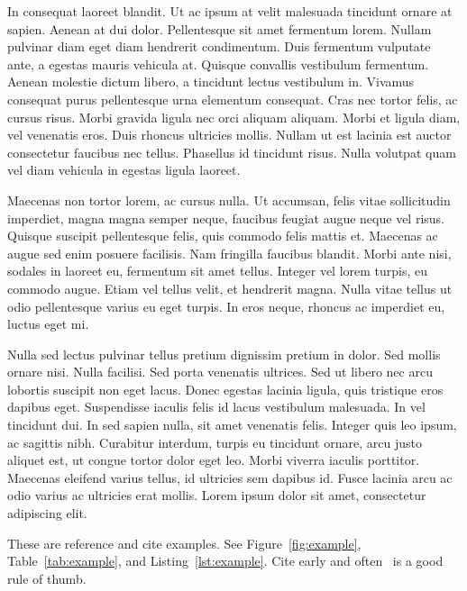 In consequat laoreet blandit. Ut ac ipsum at velit malesuada tincidunt ornare at sapien. Aenean at dui dolor. Pellentesque sit amet fermentum lorem. Nullam pulvinar diam eget diam hendrerit condimentum. Duis fermentum vulputate ante, a egestas mauris vehicula at. Quisque convallis vestibulum fermentum. Aenean molestie dictum libero, a tincidunt lectus vestibulum in. Vivamus consequat purus pellentesque urna elementum consequat. Cras nec tortor felis, ac cursus risus. Morbi gravida ligula nec orci aliquam aliquam. Morbi et ligula diam, vel venenatis eros. Duis rhoncus ultricies mollis. Nullam ut est lacinia est auctor consectetur faucibus nec tellus. Phasellus id tincidunt risus. Nulla volutpat quam vel diam vehicula in egestas ligula laoreet. 

Maecenas non tortor lorem, ac cursus nulla. Ut accumsan, felis vitae sollicitudin imperdiet, magna magna semper neque, faucibus feugiat augue neque vel risus. Quisque suscipit pellentesque felis, quis commodo felis mattis et. Maecenas ac augue sed enim posuere facilisis. Nam fringilla faucibus blandit. Morbi ante nisi, sodales in laoreet eu, fermentum sit amet tellus. Integer vel lorem turpis, eu commodo augue. Etiam vel tellus velit, et hendrerit magna. Nulla vitae tellus ut odio pellentesque varius eu eget turpis. In eros neque, rhoncus ac imperdiet eu, luctus eget mi.

Nulla sed lectus pulvinar tellus pretium dignissim pretium in dolor. Sed mollis ornare nisi. Nulla facilisi. Sed porta venenatis ultrices. Sed ut libero nec arcu lobortis suscipit non eget lacus. Donec egestas lacinia ligula, quis tristique eros dapibus eget. Suspendisse iaculis felis id lacus vestibulum malesuada. In vel tincidunt dui. In sed sapien nulla, sit amet venenatis felis. Integer quis leo ipsum, ac sagittis nibh. Curabitur interdum, turpis eu tincidunt ornare, arcu justo aliquet est, ut congue tortor dolor eget leo. Morbi viverra iaculis porttitor. Maecenas eleifend varius tellus, id ultricies sem dapibus id. Fusce lacinia arcu ac odio varius ac ultricies erat mollis. Lorem ipsum dolor sit amet, consectetur adipiscing elit. 

These are reference and cite examples. See Figure~\ref{fig:example}, Table~\ref{tab:example}, and Listing~\ref{lst:example}. Cite early and often~\cite{exampleentry} is a good rule of thumb.
